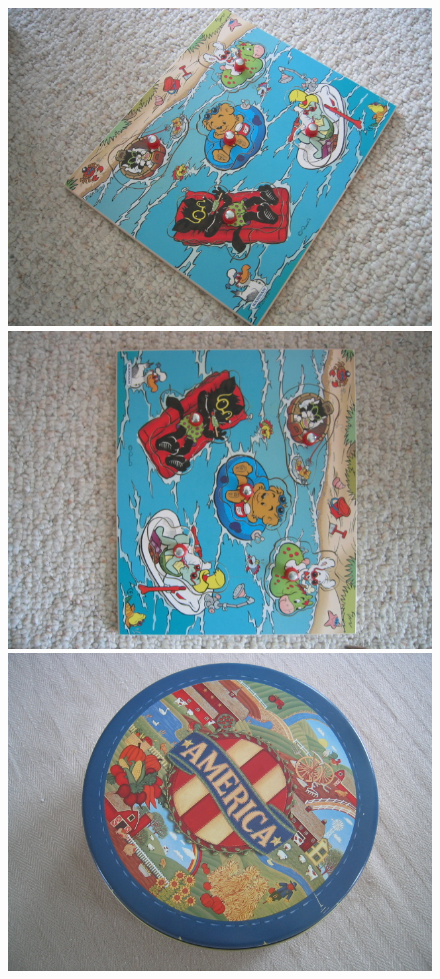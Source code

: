 \documentclass[twocolumn]{article}
\begin{document}
		\begin{figure}
			\centering
			\resizebox{1.95\columnwidth}{!}
			{
				\includegraphics[scale=0.091]{ukbench00000.jpg}
				\includegraphics[scale=0.091]{ukbench00002.jpg}
				\includegraphics[scale=0.091]{ukbench00005.jpg}
}
\end{figure}
\end{document}
